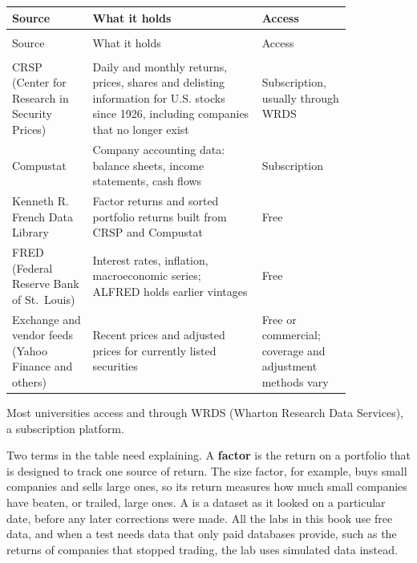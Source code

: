 \begingroup
\small
\setlength{\LTpre}{6pt}\setlength{\LTpost}{6pt}
\begin{longtable}{@{}>{\raggedright\arraybackslash}p{0.2\linewidth}>{\raggedright\arraybackslash}p{0.42\linewidth}>{\raggedright\arraybackslash}p{0.22\linewidth}@{}}
\toprule
Source & What it holds & Access \\
\midrule
\endfirsthead
\multicolumn{3}{@{}l}{\emph{(continued)}}\\
\toprule
Source & What it holds & Access \\
\midrule
\endhead
\midrule
\multicolumn{3}{r@{}}{\emph{continued on next page}}\\
\endfoot
\bottomrule
\endlastfoot
CRSP (Center for Research in Security Prices) & Daily and monthly returns, prices, shares and delisting information for U.S. stocks since 1926, including companies that no longer exist & Subscription, usually through WRDS \\*
Compustat & Company accounting data: balance sheets, income statements, cash flows & Subscription \\
Kenneth R. French Data Library & Factor returns and sorted portfolio returns built from CRSP and Compustat & Free \\
FRED (Federal Reserve Bank of St.\ Louis) & Interest rates, inflation, macroeconomic series; ALFRED holds earlier vintages & Free \\*
Exchange and vendor feeds (Yahoo Finance and others) & Recent prices and adjusted prices for currently listed securities & Free or commercial; coverage and adjustment methods vary \\
\end{longtable}
\addtocounter{table}{-1}%
\endgroup

Most universities access  and  through WRDS (Wharton Research Data Services), a subscription platform.

Two terms in the table need explaining. A \textbf{factor} is the return on a portfolio that is designed to track one source of return. The size factor, for example, buys small companies and sells large ones, so its return measures how much small companies have beaten, or trailed, large ones. A  is a dataset as it looked on a particular date, before any later corrections were made. All the labs in this book use free data, and when a test needs data that only paid databases provide, such as the returns of companies that stopped trading, the lab uses simulated data instead.

